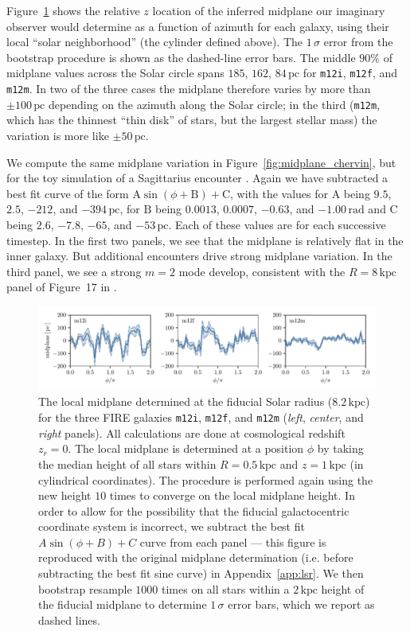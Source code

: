 \documentclass[twocolumn]{aastex62}
\newcommand{\pc}{\text{pc}}
\newcommand{\kpc}{\text{kpc}}
\newcommand{\mi}{\texttt{m12i}}
\newcommand{\mf}{\texttt{m12f}}
\newcommand{\mm}{\texttt{m12m}}
\newcommand{\z}{z_r}
\begin{document}
Figure~\ref{fig:midplane} shows the relative $z$ location of the inferred
midplane our imaginary observer would determine as a function of azimuth for
each galaxy, using their local ``solar neighborhood'' (the cylinder defined
above). The $1\,\sigma$ error from the bootstrap procedure is shown as the
dashed-line error bars. The middle $90\%$ of midplane values across the Solar
circle spans $185$, $162$, $84\,\pc$ for \mi{}, \mf{}, and \mm{}. In two of
the three cases the midplane therefore varies by more than $\pm 100\,\pc$
depending on the azimuth along the Solar circle; in the third (\mm{}, which
has the thinnest ``thin disk'' of stars, but the largest stellar mass) the
variation is more like $\pm 50\,\pc$.

We compute the same midplane variation in Figure~\ref{fig:midplane_chervin},
but for the toy simulation of a Sagittarius encounter
\citep{2018MNRAS.481..286L}. Again we have subtracted a best fit curve of the
form $\text{A} \sin{\left(\phi + \text{B}\right)} + \text{C}$, with the values
for $\text{A}$ being $9.5$, $2.5$, $-212$, and $-394\,\pc$, for $\text{B}$ being
$0.0013$, $0.0007$, $-0.63$, and $-1.00\,\text{rad}$ and $\text{C}$ being $2.6$, $-7.8$,
$-65$, and $-53\,\pc$. Each of these values are for each successive timestep. In the
first two panels, we see that the midplane is relatively flat in the inner
galaxy. But additional encounters drive strong midplane variation. In the
third panel, we see a strong $m=2$ mode develop, consistent with the
$R=8\,\kpc$ panel of Figure~17 in \citet{2018MNRAS.481..286L}.

\begin{figure}
\begin{center}
\includegraphics[width=7in]{fig/midplane_fit.pdf}
\end{center}
\caption{The local midplane determined at the fiducial Solar radius
($8.2\,\kpc$) for the three FIRE galaxies \mi{}, \mf{}, and \mm{} ({\em left},
{\em center}, and {\em right} panels). All calculations are done at cosmological redshift $\z =0$. The local midplane is determined at a
position $\phi$ by taking the median height of all stars within $R=0.5\,\kpc$
and $z=1\,\kpc$ (in cylindrical coordinates). The procedure is performed again
using the new height $10$ times to converge on the local midplane height. In
order to allow for the possibility that the fiducial galactocentric coordinate
system is incorrect, we subtract the best fit $A\sin{(\phi+B)}+C$ curve from
each panel --- this figure is reproduced with the original midplane
determination (i.e. before subtracting the best fit sine curve) in
Appendix~\ref{app:lsr}. We then bootstrap resample $1000$ times on all stars
within a $2\,\kpc$ height of the fiducial midplane to determine $1\,\sigma
$ error bars, which we report as dashed lines.}
\label{fig:midplane}
\end{figure}
\end{document}
